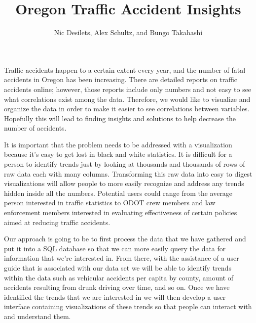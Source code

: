 \documentclass[journal]{vgtc}                %
\title{Oregon Traffic Accident Insights}
\author{Nic Desilets, Alex Schultz, and Bungo Takahashi}
\begin{document}


\maketitle

Traffic accidents happen to a certain extent every year, and the number of fatal accidents in Oregon has been increasing. 
There are detailed reports on traffic accidents online; however, those reports include only numbers and not easy to see what correlations exist among the data. 
Therefore, we would like to visualize and organize the data in order to make it easier to see correlations between variables.
Hopefully this will lead to finding insights and solutions to help decrease the number of accidents. 

It is important that the problem needs to be addressed with a visualization because it’s easy to get lost in black and white statistics. 
It is difficult for a person to identify trends just by looking at thousands and thousands of rows of raw data each with many columns. 
Transforming this raw data into easy to digest visualizations will allow people to more easily recognize and address any trends hidden inside all the numbers. 
Potential users could range from the average person interested in traffic statistics to ODOT crew members and law enforcement members interested in evaluating effectiveness of certain policies aimed at reducing traffic accidents. 

Our approach is going to be to first process the data that we have gathered and put it into a SQL database so that we can more easily query the data for information that we’re interested in. 
From there, with the assistance of a user guide that is associated with our data set we will be able to identify trends within the data such as vehicular accidents per capita by county, amount of accidents resulting from drunk driving over time, and so on. 
Once we have identified the trends that we are interested in we will then develop a user interface containing visualizations of these trends so that people can interact with and understand them.
\end{document}
